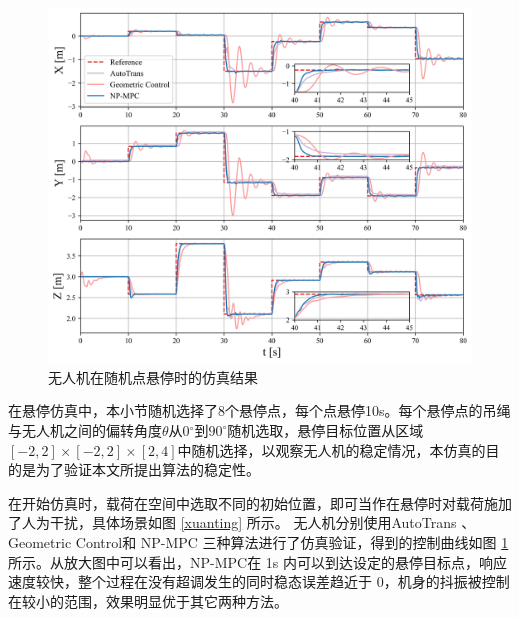 \documentclass[lang=chs, degree=master, blindreview=false, winfonts=true]{yanputhesis}
\begin{document}
\begin{figure}[hbt!]
	\centering
	\includegraphics[width=33pc]{picture/kk/comparision.png} 
	\vspace{-0.2cm}
	\caption{无人机在随机点悬停时的仿真结果} 
	\label{comparision}
\end{figure}

在悬停仿真中，本小节随机选择了8个悬停点，每个点悬停10s。每个悬停点的吊绳与无人机之间的偏转角度$\theta$从0$^\circ$到$90^\circ$随机选取，悬停目标位置从区域$[-2, 2] \times [-2, 2] \times [2, 4]$中随机选择，以观察无人机的稳定情况，本仿真的目的是为了验证本文所提出算法的稳定性。



在开始仿真时，载荷在空间中选取不同的初始位置，即可当作在悬停时对载荷施加了人为干扰，具体场景如图 \ref{xuanting} 所示。
无人机分别使用AutoTrans \cite{li2023autotrans}、Geometric Control\cite{sreenath2013geometric}和 NP-MPC 三种算法进行了仿真验证，得到的控制曲线如图 \ref{comparision} 所示。从放大图中可以看出，NP-MPC在 1s 内可以到达设定的悬停目标点，响应速度较快，整个过程在没有超调发生的同时稳态误差趋近于 0，机身的抖振被控制在较小的范围，效果明显优于其它两种方法。
\end{document}

